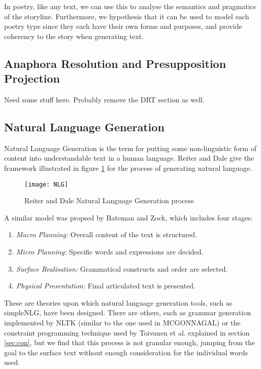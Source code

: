 In poetry, like any text, we can use this to analyse the semantics and pragmatics of the storyline. Furthermore, we hypothesis that it can be used to model each poetry type since they each have their own forms and purposes, and provide coherency to the story when generating text.

\subsection{Anaphora Resolution and Presupposition Projection}
\label{sec:arback}

Need some stuff here. Probably remove the DRT section as well.

\subsection{Natural Language Generation}
Natural Language Generation is the term for putting some non-linguistic form of content into understandable text in a human language. Reiter and Dale give the framework\cite{reiter2000building} illustrated in figure \ref{fig:nlg} for the process of generating natural language.

\begin{figure}[h!]
\centering
\texttt{[image: NLG]}
\caption{Reiter and Dale Natural Language Generation process}
\label{fig:nlg}
\end{figure}

A similar model was propsed by Bateman and Zock\cite{mitkov2003oxford}, which includes four stages:
\begin{enumerate}
\item{\textit{Macro Planning:} Overall content of the text is structured.}
\item{\textit{Micro Planning:} Specific words and expressions are decided.}
\item{\textit{Surface Realisation:} Grammatical constructs and order are selected.}
\item{\textit{Physical Presentation:} Final articulated text is presented.}
\end{enumerate}

These are theories upon which natural language generation tools, such as simpleNLG\cite{gatt2009simplenlg}, have been designed. There are others, such as grammar generation implemented by NLTK (similar to the one used in MCGONNAGAL) or the constraint programming technique used by Toivanen et al. explained in section \ref{sec:con}, but we find that this process is not granular enough, jumping from the goal to the surface text without enough consideration for the individual words used.

